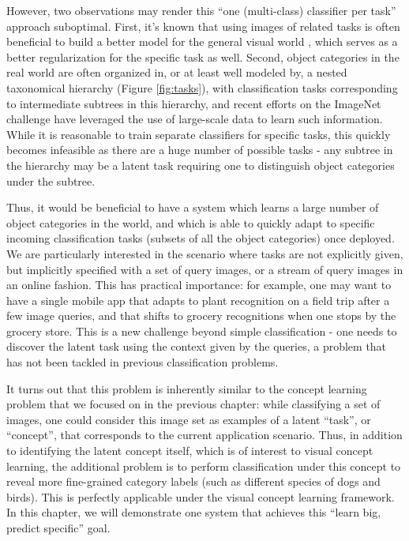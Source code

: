 However, two observations may render this ``one (multi-class) classifier per task'' approach suboptimal. First, it's known that using images of related tasks is often beneficial to build a better model for the general visual world \cite{raina2007self}, which serves as a better regularization for the specific task as well. Second, object categories in the real world are often organized in, or at least well modeled by, a nested taxonomical hierarchy (\eg Figure \ref{fig:tasks}), with classification tasks corresponding to intermediate subtrees in this hierarchy, and recent efforts on the ImageNet challenge \cite{ilsvrc,lin2011large,sanchez2011high,krizhevsky2012imagenet} have leveraged the use of large-scale data to learn such information. While it is reasonable to train separate classifiers for specific tasks, this quickly becomes infeasible as there are a huge number of possible tasks - any subtree in the hierarchy may be a latent task requiring one to distinguish object categories under the subtree.

Thus, it would be beneficial to have a system which learns a large number of object categories in the world, and which is able to quickly adapt to specific incoming classification tasks (subsets of all the object categories) once deployed. We are particularly interested in the scenario where tasks are not explicitly given, but implicitly specified with a set of query images, or a stream of query images in an online fashion. This has practical importance: for example, one may want to have a single mobile app that adapts to plant recognition on a field trip after a few image queries, and that shifts to grocery recognitions when one stops by the grocery store. This is a new challenge beyond simple classification - one needs to discover the latent task using the context given by the queries, a problem that has not been tackled in previous classification problems.

It turns out that this problem is inherently similar to the concept learning problem that we focused on in the previous chapter: while classifying a set of images, one could consider this image set as examples of a latent ``task'', or ``concept'', that corresponds to the current application scenario. Thus, in addition to identifying the latent concept itself, which is of interest to visual concept learning, the additional problem is to perform classification under this concept to reveal more fine-grained category labels (such as different species of dogs and birds). This is perfectly applicable under the visual concept learning framework. In this chapter, we will demonstrate one system that achieves this ``learn big, predict specific'' goal.


